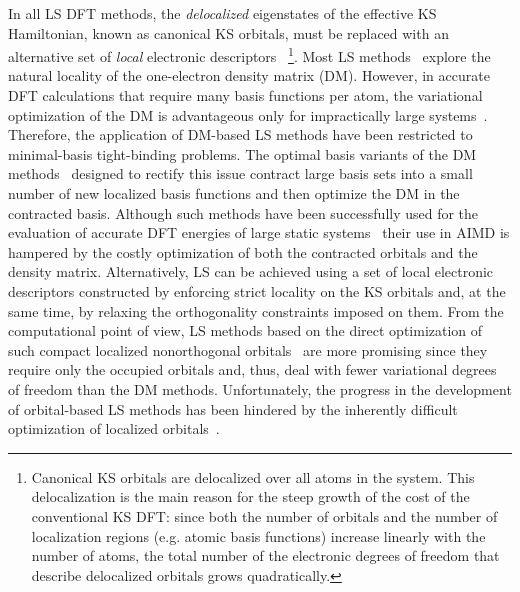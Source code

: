 \documentclass[aps,prl,reprint,amsmath,amssymb]{revtex4-1}
\begin{document}
In all LS DFT methods, the \emph{delocalized} eigenstates of the effective KS Hamiltonian, known as canonical KS orbitals, must be replaced with an alternative set of \emph{local} electronic descriptors
~\footnote{Canonical KS orbitals are delocalized over all atoms in the system. 
This delocalization is the main reason for the steep growth of the cost of the conventional KS DFT: since both the number of orbitals and the number of localization regions (e.g. atomic basis functions) increase linearly with the number of atoms, the total number of the electronic degrees of freedom that describe delocalized orbitals grows quadratically.}. 
Most LS methods~\cite{a:linscale3,a:lee-yang-1996,a:ls-scuseria-1997,a:ls-manolopoulos-1998,a:ls-helgaker-2001,a:ls-niklasson-2003,a:curvy2,a:ls-dm-sign} explore the natural locality of the one-electron density matrix (DM). 
However, in accurate DFT calculations that require many basis functions per atom, the variational optimization of the DM is advantageous only for impractically large systems~\cite{a:ls-rev-1999,a:ls-dm-sign,a:almo-ls}.
Therefore, the application of DM-based LS methods have been restricted to minimal-basis tight-binding problems. 
The optimal basis variants of the DM methods~\cite{a:ls-stechel-1994,a:ls-gillan-1995,a:ls-gillan-1996,a:ls-onetep-2003} designed to rectify this issue contract large basis sets into a small number of new localized basis functions and then optimize the DM in the contracted basis. 
Although such methods have been successfully used for the evaluation of accurate DFT energies of large static systems~\cite{a:ls-onetep-2009,a:ls-conquest-2010,a:ls-onetep-2010-app1,a:ls-rev-2012} their use in AIMD is hampered by the costly optimization of both the contracted orbitals and the density matrix. 
%
Alternatively, LS can be achieved using a set of local electronic descriptors constructed by enforcing strict locality on the KS orbitals and, at the same time, by relaxing the orthogonality constraints imposed on them. 
From the computational point of view, LS methods based on the direct optimization of such compact localized nonorthogonal orbitals~\cite{a:ls-galli-parrinello-1992,a:ls-mauri-galli-car-1993,a:ls-ordejon-1993,a:ls-mauri-galli-1994,a:ls-ordejon-1995,a:ls-kim-mauri-galli-1995,a:ls-fattebert-2004,a:ls-fattebert-2006,a:burger-yang-2008} are more promising since they require only the occupied orbitals and, thus, deal with fewer variational degrees of freedom than the DM methods. 
Unfortunately, the progress in the development of orbital-based LS methods has been hindered by the inherently difficult optimization of localized orbitals~\cite{a:ls-mauri-galli-car-1993,a:ls-ordejon-1995,a:ls-fattebert-2004,a:ls-rev-1999,a:weitao-yang-2013}. 
\end{document}
